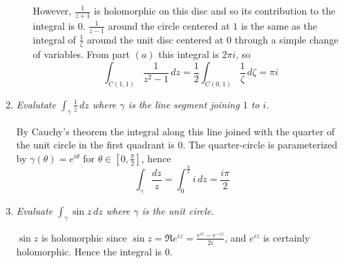 \documentclass[letterpaper, 11pt]{article}
\begin{document}
\begin{enumerate}
\begin{enumerate}
However, $\frac{1}{z+1}$ is holomorphic on this disc and so its contribution to the integral is $0$.  $\frac{1}{z-1}$ around the circle centered at $1$ is the same as the integral of $\frac{1}{\zeta}$ around the unit disc centered at $0$ through a simple change of variables.  From part $(a)$ this integral is $2\pi i$, so
\[
\int_{C(1,1)} \frac{1}{z^2-1} \,dz = \frac{1}{2}\int_{C(0,1)} \frac{1}{\zeta} \,d\zeta = \pi i
\]
\end{enumerate}

\item \emph{Evalutate $\int_{\gamma} \frac{1}{z} \,dz$ where $\gamma$ is the line segment joining $1$ to $i$.}

By Cauchy's theorem the integral along this line joined with the quarter of the unit circle in the first quadrant is $0$.  The quarter-circle is parameterized by $\gamma(\theta) = e^{i\theta}$ for $\theta \in \left[0,\frac{\pi}{2}\right]$, hence
\[
\int_{\gamma} \frac{dz}{z} = \int_0^{\frac{\pi}{2}} i \,dz = \frac{i\pi}{2}
\]

\item \emph{Evaluate $\int_{\gamma} \sin z\,dz$ where $\gamma$ is the unit circle.}

$\sin z$ is holomorphic since $\sin z = \Re e^{iz} = \frac{e^{iz} - e^{-iz}}{2i}$, and $e^{iz}$ is certainly holomorphic.  Hence the integral is $0$.

\end{enumerate}
\end{document}
